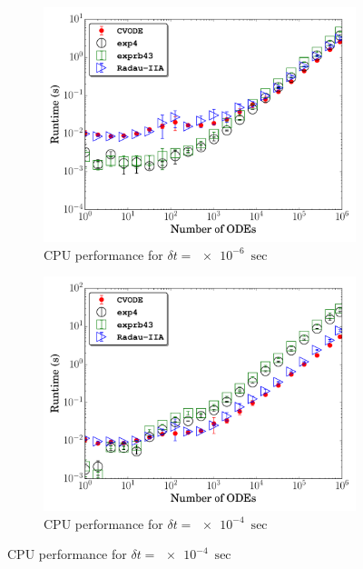 \documentclass[final,twocolumn]{elsarticle}
\begin{document}
\begin{figure}[htb]
  \ifmeasure
  \fontsize{8pt}{10pt}\selectfont
  \fi
  \centering
  \begin{subfigure}{0.49\textwidth}
      \includegraphics[width=\linewidth]{H2_1e-06_cpu_nonorm.pdf}
      \caption{CPU performance for $\delta t = \SI{e-6}{\sec}$}
  \end{subfigure}
  \begin{subfigure}{0.49\textwidth}
      \includegraphics[width=\linewidth]{H2_1e-04_cpu_nonorm.pdf}
      \caption{CPU performance for $\delta t = \SI{e-4}{\sec}$}
 

\end{subfigure}
\end{figure}
\end{document}
